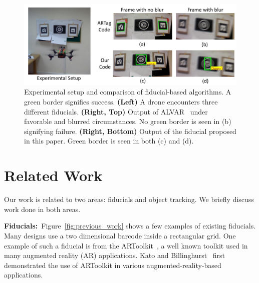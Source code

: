 \documentclass[10pt,twocolumn,letterpaper]{article}
\begin{document}
\begin{figure}[t!]
  \includegraphics[width=\linewidth]{images/teaser}
  \caption{Experimental setup and comparison of fiducial-based
    algorithms. A green border signifies success. 
    \textbf{(Left)} A drone encounters three different fiducials. 
    \textbf{(Right, Top)} Output of ALVAR~\cite{alvar} under favorable and blurred
    circumstances. No green border is seen in (b) signifying failure.
    \textbf{(Right, Bottom)} Output of the fiducial proposed in this paper. Green
    border is seen in both (c) and (d).
    \label{fig:teaser}}
  \end{figure}

\section{Related Work}

Our work is related to two areas: fiducials and object tracking. We
briefly discuss work done in both areas.

\textbf{Fiducials:}~Figure~\ref{fig:previous_work} shows a few
examples of existing fiducials.  Many designs use a two
dimensional barcode inside a rectangular grid. One example of such a
fiducial is from the ARToolkit~\cite{ARToolkit02}, a well known
toolkit used in many augmented reality (AR) applications. Kato and
Billinghurst~\cite{kato-artoolkit} first demonstrated the use of
ARToolkit in various augmented-reality-based applications.
\end{document}
